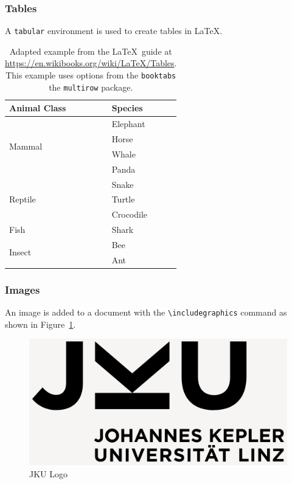 \documentclass[11pt,a4paper]{article} %
\begin{document}
\subsubsection{Tables}
A \verb|tabular| environment is used to create tables in \LaTeX.
\begin{table}[h] %
  \centering
  \begin{tabular}{ll}
    \toprule
    Animal Class & Species \\
    \midrule
    \multirow{4}{*}{Mammal} & Elephant\\
                            & Horse \\
                            & Whale \\
                            & Panda \\
    \midrule
    \multirow{3}{*}{Reptile} & Snake \\
                             & Turtle \\
                             & Crocodile \\
    \midrule
    Fish & Shark \\
    \midrule
    \multirow{2}{*}{Insect} & Bee\\
                            & Ant\\
    \bottomrule
  \end{tabular}
  \caption{Adapted example from the \LaTeX\ guide at \url{https://en.wikibooks.org/wiki/LaTeX/Tables}. This example uses options from the \texttt{booktabs} the \texttt{multirow} package.}
  \label{tab:intro} %
\end{table}

\subsubsection{Images}
An image is added to a document with the \verb|\includegraphics| command as shown in Figure~\ref{fig:jku_logo}.

\begin{figure}[!htb]
    \centering
    \includegraphics[width=\textwidth]{img/JKU_Logo.png}
    \caption{JKU Logo}
    \label{fig:jku_logo}
\end{figure}
\end{document}
